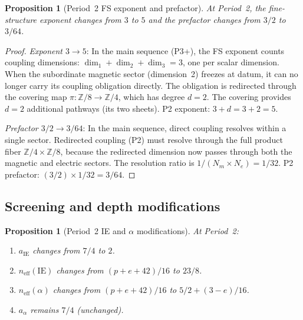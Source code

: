 \documentclass[11pt,a4paper]{article}
\newtheorem{proposition}[theorem]{Proposition}
\begin{document}
\begin{proposition}[Period~2 FS exponent and prefactor]
\label{prop:p2-fs}
At Period~2, the fine-structure exponent changes from $3$ to $5$ and the prefactor changes from $3/2$ to $3/64$.
\end{proposition}

\begin{proof}
\emph{Exponent $3 \to 5$}: In the main sequence (P3+), the FS exponent counts coupling dimensions: $\dim_1 + \dim_2 + \dim_3 = 3$, one per scalar dimension. When the subordinate magnetic sector (dimension~2) freezes at datum, it can no longer carry its coupling obligation directly. The obligation is redirected through the covering map $\pi: \mathbb{Z}/8 \to \mathbb{Z}/4$, which has degree $d = 2$. The covering provides $d = 2$ additional pathways (its two sheets). P2 exponent: $3 + d = 3 + 2 = 5$.

\emph{Prefactor $3/2 \to 3/64$}: In the main sequence, direct coupling resolves within a single sector. Redirected coupling (P2) must resolve through the full product fiber $\mathbb{Z}/4 \times \mathbb{Z}/8$, because the redirected dimension now passes through both the magnetic and electric sectors. The resolution ratio is $1/(N_m \times N_e) = 1/32$. P2 prefactor: $(3/2) \times 1/32 = 3/64$.
\end{proof}

\subsection{Screening and depth modifications}

\begin{proposition}[Period~2 IE and $\alpha$ modifications]
\label{prop:p2-ie-alpha}
At Period~2:
\begin{enumerate}[label=(\roman*)]
\item $a_{\mathrm{IE}}$ changes from $7/4$ to $2$.
\item $n_{\mathrm{eff}}(\mathrm{IE})$ changes from $(p + e + 42)/16$ to $23/8$.
\item $n_{\mathrm{eff}}(\alpha)$ changes from $(p + e + 42)/16$ to $5/2 + (3 - e)/16$.
\item $a_\alpha$ remains $7/4$ (unchanged).
\end{enumerate}
\end{proposition}
\end{document}
